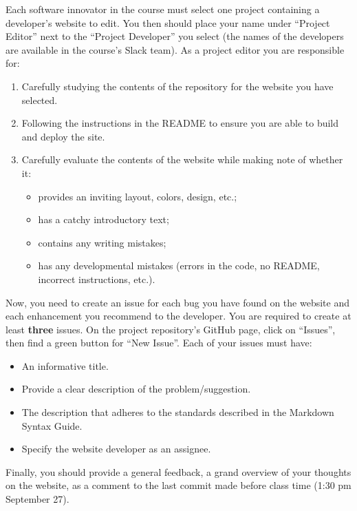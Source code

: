 \documentclass[11pt]{article}
\begin{document}
Each software innovator in the course must select one project containing a developer's website to edit. You then should place your name under ``Project Editor'' next to the ``Project Developer'' you select (the names of the developers are available in the course's Slack team). As a project editor you are responsible for:
\vspace{-0.05in}
\begin{enumerate}
	\item Carefully studying the contents of the repository for the website you have selected. 
	\item Following the instructions in the README to ensure you are able to build and deploy the site. 
	\item Carefully evaluate the contents of the website while making note of whether it:
	\begin{itemize}
		\item provides an inviting layout, colors, design, etc.;
		\item has a catchy introductory text; 
		\item contains any writing mistakes;
		\item has any developmental mistakes (errors in the code, no README, incorrect instructions, etc.).
	\end{itemize}
\end{enumerate} 
\vspace{-0.05in}

Now, you need to create an issue for each bug you have found on the website and each enhancement you recommend to the developer. You are required to create at least \textbf{three} issues. On the project repository's GitHub page, click on ``Issues'', then find a green button for ``New Issue''. Each of your issues must have:
\vspace{-0.05in}
\begin{itemize}
	\item An informative title.
	\item Provide a clear description of the problem/suggestion. 
	\item The description that adheres to the standards described in the Markdown Syntax Guide.
	\item Specify the website developer as an assignee.
\end{itemize}

Finally, you should provide a general feedback, a grand overview of your thoughts on the website, as a comment to the last commit made before class time (1:30 pm September 27). 
\end{document}
